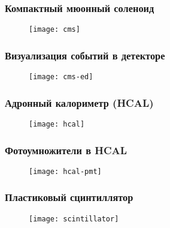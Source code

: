 \begin{frame}
    \frametitle{Компактный мюонный соленоид}
    \begin{figure}
        \begin{centering}
            \texttt{[image: cms]}
        \end{centering}
    \end{figure}
\end{frame}
\begin{frame}
    \frametitle{Визуализация событий в детекторе}
    \begin{figure}
        \begin{centering}
            \texttt{[image: cms-ed]}
        \end{centering}
    \end{figure}
\end{frame}
\begin{frame}
    \frametitle{Адронный калориметр (HCAL)}
    \begin{figure}
        \begin{centering}
            \texttt{[image: hcal]}
        \end{centering}
    \end{figure}
\end{frame}
\begin{frame}
    \frametitle{Фотоумножители в HCAL}
    \begin{figure}
        \begin{centering}
            \texttt{[image: hcal-pmt]}
        \end{centering}
    \end{figure}
\end{frame}
\begin{frame}
    \frametitle{Пластиковый сцинтиллятор}
    \begin{figure}
        \begin{centering}
            \texttt{[image: scintillator]}
        \end{centering}
    \end{figure}
\end{frame}

